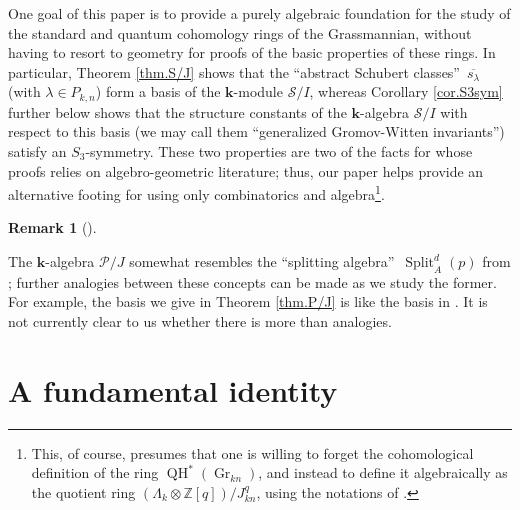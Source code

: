 \documentclass[numbers=enddot,12pt,final,onecolumn,notitlepage]{scrartcl}%
\theoremstyle{definition}
\newtheorem{remk}[theo]{Remark}
\newenvironment{remark}[1][]
{\begin{remk}[#1]\begin{leftbar}}
{\end{leftbar}\end{remk}}
\begin{document}
One goal of this paper is to provide a purely algebraic foundation for the
study of the standard and quantum cohomology rings of the Grassmannian,
without having to resort to geometry for proofs of the basic properties of
these rings. In particular, Theorem \ref{thm.S/J} shows that the
\textquotedblleft abstract Schubert classes\textquotedblright\ $\overline
{s_{\lambda}}$ (with $\lambda\in P_{k,n}$) form a basis of the $\mathbf{k}%
$-module $\mathcal{S}/I$, whereas Corollary \ref{cor.S3sym} further below
shows that the structure constants of the $\mathbf{k}$-algebra $\mathcal{S}/I$
with respect to this basis (we may call them \textquotedblleft generalized
Gromov-Witten invariants\textquotedblright) satisfy an $S_{3}$-symmetry. These
two properties are two of the facts for whose proofs \cite{Postni05} relies on
algebro-geometric literature; thus, our paper helps provide an alternative
footing for \cite{Postni05} using only combinatorics and
algebra\footnote{This, of course, presumes that one is willing to forget the
cohomological definition of the ring $\operatorname*{QH}\nolimits^{\ast
}\left(  \operatorname*{Gr}\nolimits_{kn}\right)  $, and instead to define it
algebraically as the quotient ring $\left(  \Lambda_{k}\otimes\mathbb{Z}%
\left[  q\right]  \right)  /J_{kn}^{q}$, using the notations of
\cite{Postni05}.}.

\begin{remark}
The $\mathbf{k}$-algebra $\mathcal{P}/J$ somewhat resembles the
\textquotedblleft splitting algebra\textquotedblright\ $\operatorname*{Split}%
\nolimits_{A}^{d}\left(  p\right)  $ from \cite[\S 1.3]{LakTho12}; further
analogies between these concepts can be made as we study the former. For
example, the basis we give in Theorem \ref{thm.P/J} is like the basis in
\cite[(1.5)]{LakTho12}. It is not currently clear to us whether there is more
than analogies.
\end{remark}


\section{A fundamental identity}
\end{document}
